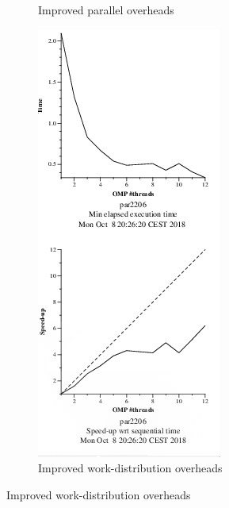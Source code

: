 \documentclass{article}
\begin{document}
\begin{figure}[htbp]
\begin{subfigure}[b]{0.35\textwidth}
        \caption{Improved parallel overheads}
    \end{subfigure}
    \begin{subfigure}[b]{0.35\textwidth}
        \includegraphics[width=\textwidth]{strongWorkDist.png}
        \caption{Improved work-distribution overheads}
    \end{subfigure}
\end{figure}
\end{document}
